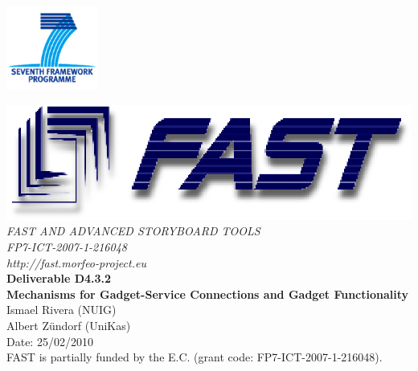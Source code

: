 \documentclass{fast_latex}
\newcommand\deliverableNumber{D4.3.2}
\newcommand\deliverableTitle{Mechanisms for Gadget-Service Connections and Gadget Functionality}
\newcommand\authorOne{Ismael Rivera (NUIG)}
\newcommand\authorTwo{Albert Zündorf (UniKas)}
\begin{document}

\def\note#1{\marginpar{\footnotesize#1}} %



\thispagestyle{empty}


\begin{flushright}
	\includegraphics[width=3cm]{images/FP7_logo}
\end{flushright}

\vspace{1cm}

	\begin{center}
		\includegraphics{images/FAST_logo}\\
		\vspace{1cm}
		{\LARGE{\sffamily \emph{FAST AND ADVANCED STORYBOARD TOOLS}}}\\
		\vspace{0.5cm}
		{\LARGE \sffamily \emph{FP7-ICT-2007-1-216048}}\\
		\vspace{0.5cm}
		{\LARGE \sffamily \emph{http://fast.morfeo-project.eu}}\\
		\vspace{4cm}
		{\LARGE \sffamily \textbf{Deliverable \deliverableNumber}}\\
		\vspace{0.5cm}
		{\LARGE \sffamily \textbf{\deliverableTitle}}\\
		\vspace{2cm}
		{\large \sffamily \authorOne}\\
		{\large \sffamily \authorTwo}\\
		\vspace{0.5cm}
		\vfill
		{\large \sffamily Date: 25/02/2010}\\
		\vspace{1cm}
		{\sffamily FAST is partially funded by the E.C. (grant code: FP7-ICT-2007-1-216048).}
		
	\end{center}
\end{document}
